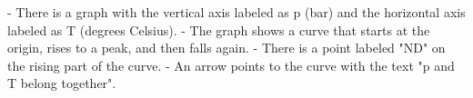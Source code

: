 - There is a graph with the vertical axis labeled as p (bar) and the horizontal axis labeled as T (degrees Celsius).
- The graph shows a curve that starts at the origin, rises to a peak, and then falls again.
- There is a point labeled "ND" on the rising part of the curve.
- An arrow points to the curve with the text "p and T belong together".